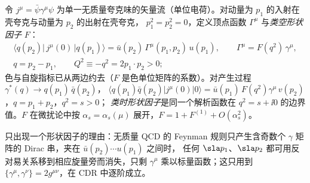 \begin{definition}[夸克形状因子]\label{def:sudakov-ff}
令 $j^\mu=\bar\psi\gamma^\mu\psi$ 为单一无质量夸克味的矢量流（单位电荷）。对动量为 $p_1$ 的入射在壳夸克与动量为 $p_2$ 的出射在壳夸克，
$p_1^2=p_2^2=0$，定义顶点函数 $\Gamma^\mu$ 与\emph{类空形状因子} $F$：
\begin{equation}\label{eq:sudakov-ff-def}
\begin{gathered}
\langle q(p_2)|\,j^\mu(0)\,|q(p_1)\rangle=\bar u(p_2)\,\Gamma^\mu(p_1,p_2)\,u(p_1),\qquad
\Gamma^\mu=F(q^2)\,\gamma^\mu,\\
q=p_2-p_1,\qquad Q^2\equiv-q^2=2p_1\cdot p_2>0 ;
\end{gathered}
\end{equation}
色与自旋指标已从两边约去（$F$ 是色单位矩阵的系数）。对产生过程 $\gamma^*(q)\to q(p_1)\,\bar q(p_2)$，
$\langle q(p_1)\bar q(p_2)|j^\mu(0)|0\rangle=\bar u(p_1)\,F(q^2)\gamma^\mu\,v(p_2)$，$q=p_1+p_2$，$q^2=s>0$；
\emph{类时形状因子}是同一个解析函数在 $q^2=s+\ii0$ 的边界值。$F$ 在微扰论中按 $\alpha_s=\alpha_s(\mu)$ 展开，$F=1+F^{(1)}+O(\alpha_s^2)$。
\end{definition}

只出现一个形状因子的理由：无质量 QCD 的 Feynman 规则只产生含奇数个 $\gamma$ 矩阵的 Dirac 串，夹在 $\bar u(p_2)\cdots u(p_1)$ 之间时，
任何 $\sla p_1$、$\sla p_2$ 都可用反对易关系移到相应旋量旁而消失，只剩 $\gamma^\mu$ 乘以标量函数；这只用到 $\{\gamma^\mu,\gamma^\nu\}=2g^{\mu\nu}$，在 CDR 中逐阶成立。


